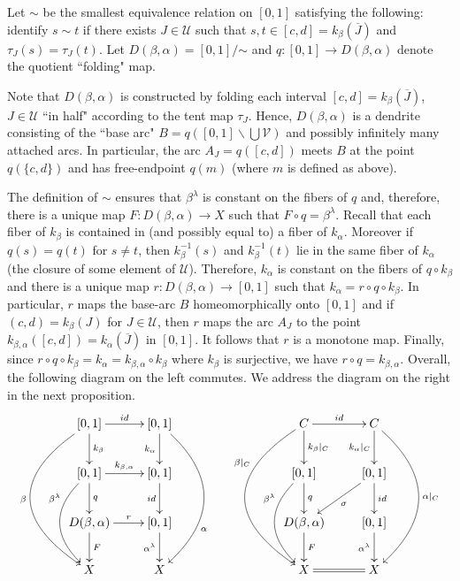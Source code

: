 \documentclass[12pt, leqno]{amsart}
\newcommand{\light}{\lambda}
\newcommand{\ui}{[0,1]}
\newcommand{\scru}{\mathscr{U}}
\newcommand{\scrv}{\mathscr{V}}
\newcommand{\ov}{\overline}
\theoremstyle{definition}\newtheorem{definition}[theorem]{Definition}
\begin{document}
Let $\sim$ be the smallest equivalence relation on $\ui$ satisfying the following: identify $s\sim t$ if there exists $J\in\scru$ such that $s,t\in [c,d]=k_{\beta}(\ov{J})$ and $\tau_J(s)=\tau_J(t)$. Let $D(\beta,\alpha)=\ui/\mathord{\sim}$ and $q:\ui\to D(\beta,\alpha)$ denote the quotient ``folding" map.

Note that $D(\beta,\alpha)$ is constructed by folding each interval $[c,d]=k_{\beta}(\ov{J})$, $J\in\scru$ ``in half" according to the tent map $\tau_J$. Hence, $D(\beta,\alpha)$ is a dendrite consisting of the ``base arc" $B=q(\ui\backslash \bigcup\scrv)$ and possibly infinitely many attached arcs. In particular, the arc $A_J=q([c,d])$ meets $B$ at the point $q(\{c,d\})$ and has free-endpoint $q(m)$ (where $m$ is defined as above).

The definition of $\sim$ ensures that $\beta^{\light}$ is constant on the fibers of $q$ and, therefore, there is a unique map $F:D(\beta,\alpha)\to X$ such that $F\circ q=\beta^{\light}$. Recall that each fiber of $k_{\beta}$ is contained in (and possibly equal to) a fiber of $k_{\alpha}$. Moreover if $q(s)=q(t)$ for $s\neq t$, then $k_{\beta}^{-1}(s)$ and $k_{\beta}^{-1}(t)$ lie in the same fiber of $k_{\alpha}$ (the closure of some element of $\scru$). Therefore, $k_{\alpha}$ is constant on the fibers of $q\circ k_{\beta}$ and there is a unique map $r:D(\beta,\alpha)\to \ui$ such that $k_{\alpha}=r\circ q\circ k_{\beta}$. In particular, $r$ maps the base-arc $B$ homeomorphically onto $\ui$ and if $(c,d)=k_{\beta}(J)$ for $J\in\scru$, then $r$ maps the arc $A_J$ to the point $k_{\beta,\alpha}([c,d])=k_{\alpha}(\ov{J})$ in $\ui$. It follows that $r$ is a monotone map. Finally, since $r\circ q\circ k_{\beta}=k_{\alpha}=k_{\beta,\alpha}\circ k_{\beta}$ where $k_{\beta}$ is surjective, we have $r\circ q=k_{\beta, \alpha}$. Overall, the following diagram on the left commutes. We address the diagram on the right in the next proposition.
\[\xymatrix{
\ui \ar@/_4pc/[ddd]_-{\beta} \ar[d]^-{k_{\beta}} \ar[r]^-{id} & \ui \ar[d]_-{k_{\alpha}} \ar@/^3pc/[ddd]^(.7){\alpha} &&&  C \ar@/_4pc/[ddd]_(.3){\beta|_{C}} \ar[d]^-{k_{\beta}|_{C}} \ar[r]^-{id} & C \ar[d]_-{k_{\alpha}|_{C}} \ar@/^3pc/[ddd]^-{\alpha|_{C}}   \\
\ui \ar@/_2pc/[dd]_(.3){\beta^{\light}} \ar[d]^-{q} \ar[r]^-{k_{\beta,\alpha}} & \ui \ar[d]_-{id} &&&  \ui \ar@/_2pc/[dd]_(.3){\beta^{\light}} \ar[d]^-{q}  & \ui \ar[dl]^-{\sigma} \ar[d]^-{id}   \\
D(\beta,\alpha) \ar[d]^-{F} \ar[r]^-{r} & \ui \ar[d]_-{\alpha^{\light}} &&& D(\beta,\alpha) \ar[d]^-{F}  & \ui \ar[d]_-{\alpha^{\light}}\\
X & X &&&  X \ar@{=}[r] & X
}\]
\end{document}
